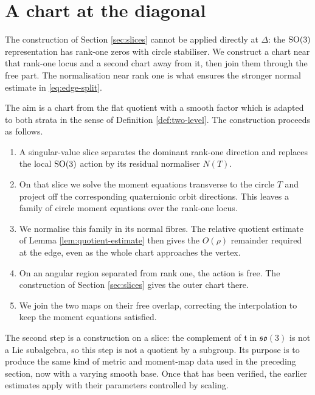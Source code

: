 \section{A chart at the diagonal}\label{sec:diagonal}

The construction of Section \ref{sec:slices} cannot be applied
directly at $\Delta$: the $\operatorname{SO}(3)$ representation has rank-one
zeros with circle stabiliser. We construct a chart near that
rank-one locus and a second chart away from it, then join them
through the free part. The normalisation near rank one is what
ensures the stronger normal estimate in \eqref{eq:edge-split}.

The aim is a chart from the flat quotient with a smooth factor
which is adapted to both strata in the sense of Definition
\ref{def:two-level}. The construction proceeds as follows.
\begin{enumerate}
\item A singular-value slice separates the dominant rank-one
direction and replaces the local $\operatorname{SO}(3)$ action by its residual
normaliser $N(T)$.
\item On that slice we solve the moment equations transverse to
the circle $T$ and project off the corresponding quaternionic
orbit directions. This leaves a family of circle moment equations
over the rank-one locus.
\item We normalise this family in its normal fibres. The relative
quotient estimate of Lemma \ref{lem:quotient-estimate} then gives
the $O(\rho)$ remainder required at the edge, even as the whole
chart approaches the vertex.
\item On an angular region separated from rank one, the action is
free. The construction of Section \ref{sec:slices} gives the outer
chart there.
\item We join the two maps on their free overlap, correcting the
interpolation to keep the moment equations satisfied.
\end{enumerate}
The second step is a construction on a slice: the complement of
$\mathfrak t$ in $\mathfrak{so}(3)$ is not a Lie subalgebra,
so this step is not a quotient by a subgroup. Its purpose is to
produce the same kind of metric and moment-map data used in the
preceding section, now with a varying smooth base. Once that has
been verified, the earlier estimates apply with their parameters
controlled by scaling.

